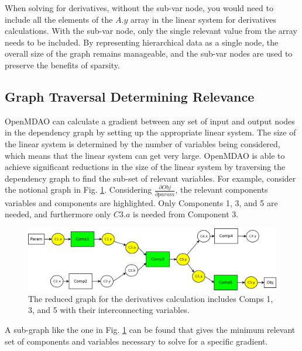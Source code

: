 \documentclass[]{aiaa-tc} %
\begin{document}
    When solving for derivatives, without the sub-var node, you would need to include all the
    elements of the $A.y$ array in the linear system for derivatives calculations.
    With the sub-var node, only the single relevant value from the array needs to be included.
    By representing hierarchical data as a single node, the overall size of the graph
    remains manageable, and the sub-var nodes are used to preserve the benefits of sparsity.


    \subsection{Graph Traversal Determining Relevance}

        OpenMDAO can calculate a gradient between any set of input and output nodes in the
        dependency graph by setting up the appropriate linear system. The size of the linear system
        is determined by the number of variables being considered, which means that the linear
        system can get very large. OpenMDAO is able to achieve significant reductions in the
        size of the linear system by traversing the dependency graph to find the sub-set of relevant variables.
        For example, consider the notional graph in Fig. \ref{fig:graph2}. Considering $\frac{\partial Obj}{\partial param}$,
        the relevant components variables and components are highlighted. Only Components 1, 3, and 5 are needed,
        and furthermore only $C3.a$ is needed from Component 3.

        \begin{figure}[!htb]\begin{center}
          \includegraphics[width=.8\textwidth]{images/Graph2}
          \caption{ The reduced graph for the derivatives calculation includes Comps 1, 3,
          and 5 with their interconnecting variables. \label{fig:graph2}}
        \end{center}\end{figure}

        A sub-graph like the one in Fig. \ref{fig:graph2} can be found that gives
        the minimum relevant set of components and variables necessary to solve for a specific
        gradient.
\end{document}

